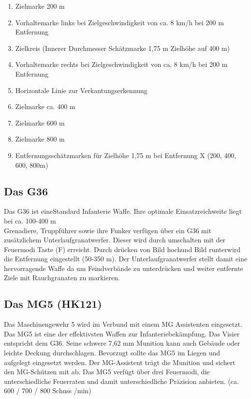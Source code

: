 \begin{enumerate}
	\item Zielmarke 200 m
	\item Vorhaltemarke links bei Zielgeschwindigkeit von ca. 8 km/h bei 200 m Entfernung
	\item Zielkreis (Innerer Durchmesser Schätzmarke 1,75 m Zielhöhe auf 400 m)
	\item Vorhaltemarke rechts bei Zielgeschwindigkeit von ca. 8 km/h bei 200 m Entfernung
	\item Horizontale Linie zur Verkantungserkennung
	\item Zielmarke ca. 400 m
	\item Zielmarke 600 m
	\item Zielmarke 800 m
	\item Entfernungsschätzmarken für Zielhöhe 1,75 m bei Entfernung X (200, 400, 600, 800m)
\end{enumerate}

\subsection{Das G36}
	Das G36 ist eineStandard Infanterie Waffe. Ihre optimale Einsatzreichweite liegt bei ca. 100-400 m \\
	Grenadiere, Truppführer sowie ihre Funker verfügen über ein G36 mit zusätzlichem Unterlaufgranatwerfer. Dieser wird durch umschalten mit der Feuermodi Taste (F) erreicht. Durch drücken von \glqq Bild hoch\grqq und \glqq Bild runter\grqq wird die Entfernung eingestellt (50-350 m). Der Unterlaufgranatwerfer stellt damit eine hervorragende Waffe da um Feindverbände zu unterdrücken und weiter entfernte Ziele mit Rauchgranaten zu markieren. \\

\subsection{Das MG5 (HK121)}
	Das Maschinengewehr 5 wird im Verbund mit einem MG Assistenten eingesetzt. Das MG5 ist eine der effektivsten Waffen zur Infanteriebekämpfung. Das Visier entspricht dem G36. Seine schwere 7,62 mm Munition kann auch Gebäude oder leichte Deckung durchschlagen. Bevorzugt sollte das MG5 im Liegen und aufgelegt eingesetzt werden. Der MG-Assistent trägt die Munition und sichert den MG-Schützen mit ab. Das MG5 verfügt über drei Feuermodi, die unterschiedliche Feuerraten und damit unterschiedliche Präzision anbieten.  (ca. 600  / 700 / 800 Schuss /min) \\

